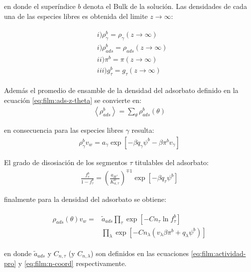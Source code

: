 \noindent en donde el super\'indice $b$ denota el Bulk de la soluci\'on. 
Las densidades de cada una de las especies libres es obtenida del limite  $z \to \infty$:

\begin{align}
	\begin{aligned}
		& i)\rho^b_\gamma =\rho_\gamma (z \rightarrow \infty)   \\
		& i)\rho^b_{ads} =\rho_{ads} (z \rightarrow \infty)   \\
		& ii)  \pi^b = \pi(z \rightarrow \infty) \\
		& iii) g_\tau^b = g_\tau(z \rightarrow \infty)  
	\end{aligned}
\end{align}

Adem\'as el promedio de ensamble de la densidad del adsorbato definido en la ecuaci\'on \ref{eq:film:ads-z-theta} se convierte en:
\begin{align}
	\left<\rho^b_{ads}\right> = \sum_{\theta}\rho^b_{ads}(\theta)
\end{align}

en consecuencia para las especies libres $\gamma$ resulta:
\begin{align}
	\rho^b_\gamma v_w = a_\gamma \exp\left[ -\beta q_\gamma \psi^b -\beta \pi^b v_\gamma \right]
	\label{eq:film:rhofree-bulk}
\end{align}

El grado de disosiaci\'on de los segmentos $\tau$ titulables del adsorbato:
\begin{align}
		\frac{f^b_\tau}{1-f^b_\tau} = \left(\frac{a_{H^+}}{K^0_{a,\tau}}\right)^{\mp 1} \exp[-\beta q_\tau \psi^b]
\end{align}


finalmente para la densidad del adsorbato se obtiene:

\begin{align}
	\begin{aligned}
		\rho_{ads}(\theta)v_w = &\tilde{a}_{ads} \prod_\tau \exp\left[-Cn_\tau \ln f^b_\tau\right] \\
		& \prod_\lambda \exp \left[-Cn_\lambda (v_\lambda\beta\pi^b + q_\lambda \psi^b) \right]
	\end{aligned}
	\label{eq:film:rhopro-bulk}
\end{align}

\noindent en donde $\tilde{a}_{ads}$ y $C_{n,\tau}$ (y $C_{n,\lambda}$) son definidos en las ecuaciones  \ref{eq:film:actividad-pro} y \ref{eq:film:n-coord} respectivamente. 

